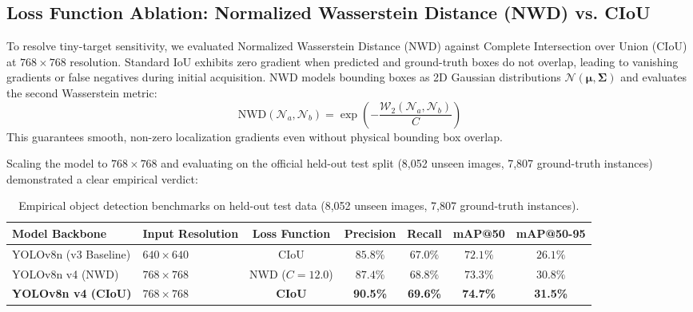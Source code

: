 \documentclass[11pt,a4paper]{article}
\begin{document}
\subsection{Loss Function Ablation: Normalized Wasserstein Distance (NWD) vs. CIoU}
To resolve tiny-target sensitivity, we evaluated Normalized Wasserstein Distance (NWD) against Complete Intersection over Union (CIoU) at $768\times 768$ resolution. Standard IoU exhibits zero gradient when predicted and ground-truth boxes do not overlap, leading to vanishing gradients or false negatives during initial acquisition. NWD models bounding boxes as 2D Gaussian distributions $\mathcal{N}(\boldsymbol{\mu}, \boldsymbol{\Sigma})$ and evaluates the second Wasserstein metric:
\begin{equation}
    \text{NWD}(\mathcal{N}_a, \mathcal{N}_b) = \exp\left( -\frac{\mathcal{W}_2(\mathcal{N}_a, \mathcal{N}_b)}{C} \right)
\end{equation}
This guarantees smooth, non-zero localization gradients even without physical bounding box overlap. 

Scaling the model to $768\times 768$ and evaluating on the official held-out test split (8,052 unseen images, 7,807 ground-truth instances) demonstrated a clear empirical verdict:

\begin{table}[h!]
\centering
\small
\begin{tabularx}{\textwidth}{lXccccc}
\toprule
\textbf{Model Backbone} & \textbf{Input Resolution} & \textbf{Loss Function} & \textbf{Precision} & \textbf{Recall} & \textbf{mAP@50} & \textbf{mAP@50-95} \\
\midrule
YOLOv8n (v3 Baseline) & $640 \times 640$ & CIoU & $85.8\%$ & $67.0\%$ & $72.1\%$ & $26.1\%$ \\
YOLOv8n v4 (NWD) & $768 \times 768$ & NWD ($C=12.0$) & $87.4\%$ & $68.8\%$ & $73.3\%$ & $30.8\%$ \\
\textbf{YOLOv8n v4 (CIoU)} & $768 \times 768$ & \textbf{CIoU} & \textbf{90.5\%} & \textbf{69.6\%} & \textbf{74.7\%} & \textbf{31.5\%} \\
\bottomrule
\end{tabularx}
\caption{Empirical object detection benchmarks on held-out test data (8,052 unseen images, 7,807 ground-truth instances).}
\label{tab:detection_ablation}
\end{table}
\end{document}
